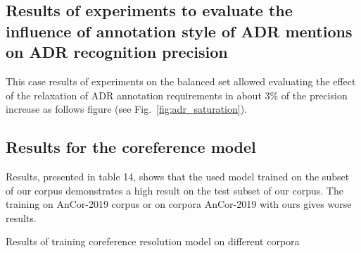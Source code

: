\documentclass[a4paper,fleqn,longmktitle]{cas-dc}
\begin{document}
\subsection{Results of experiments to evaluate the influence of annotation style of ADR mentions on ADR recognition precision}%
This case results of experiments on the balanced set allowed evaluating the effect of the relaxation of ADR annotation requirements in about 3\% of the precision increase as follows figure (see Fig.~\ref{fig:adr_saturation}).
\subsection{Results for the coreference model} Results, presented in table 14, shows that  the used model trained on the  subset of our corpus demonstrates a high result  on the   test subset of our corpus. The training on AnCor-2019 corpus or on  corpora AnCor-2019  with ours gives worse results.





\begin{table*}
\centering
\caption{Results of training coreference resolution model on different corpora}
\label{tab:coref_eval}

\end{table*}


\end{document}
